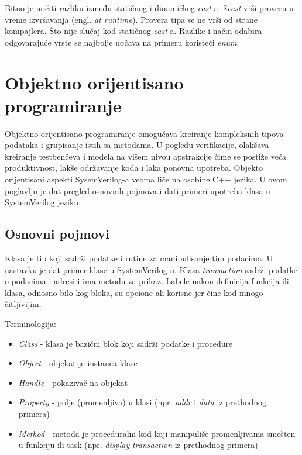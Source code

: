 Bitno je uočiti razliku između statičnog i dinamičkog \emph{cast}-a.
\emph{\(\$\)cast} vrši proveru u vreme izvršavanja (engl. \emph{at runtime}).
Provera tipa se ne vrši od strane kompajlera.
Što nije slučaj kod statičnog \emph{cast}-a.
Razlike i način odabira odgovarajuće vrste se najbolje uočava na primeru
koristeći \emph{enum}:




\section{Objektno orijentisano programiranje}

Objektno orijentisano programiranje omogućava kreiranje kompleksnih tipova
podataka i grupisanje istih sa metodama. U pogledu verifikacije, olakšava
kreiranje testbenčeva i modela na višem nivou apstrakcije čime se postiže veća
produktivnost, lakše održavanje koda i laka ponovna upotreba. Objekto
orijentisani aspekti SysemVerilog-a veoma liče na osobine C++ jezika. U ovom
poglavlju je dat pregled osnovnih pojmova i dati primeri upotreba klasa u
SystemVerilog jeziku.


\subsection{Osnovni pojmovi}

Klasa je tip koji sadrži podatke i rutine za manipulisanje tim podacima. U
nastavku je dat primer klase u SystemVerilog-u. Klasa \emph{transaction} sadrži
podatke o podacima i adresi i ima metodu za prikaz. Labele nakon definicija
funkcija ili klasa, odnosno bilo kog bloka, su opcione ali korisne jer čine kod
mnogo čitljivijim.



Terminologija:

\begin{itemize}
\item \emph{Class} - klasa je bazični blok koji sadrži podatke i procedure
\item \emph{Object} - objekat je instanca klase
\item \emph{Handle} - pokazivač na objekat
\item \emph{Property} - polje (promenljiva) u klasi (npr. \emph{addr} i
  \emph{data} iz prethodnog primera)
\item \emph{Method} - metoda je proceduralni kod koji manipuliše promenljivama
  smešten u funkciju ili task (npr. \emph{display\(\_\)transaction} iz prethodnog
  primera)
\end{itemize}


